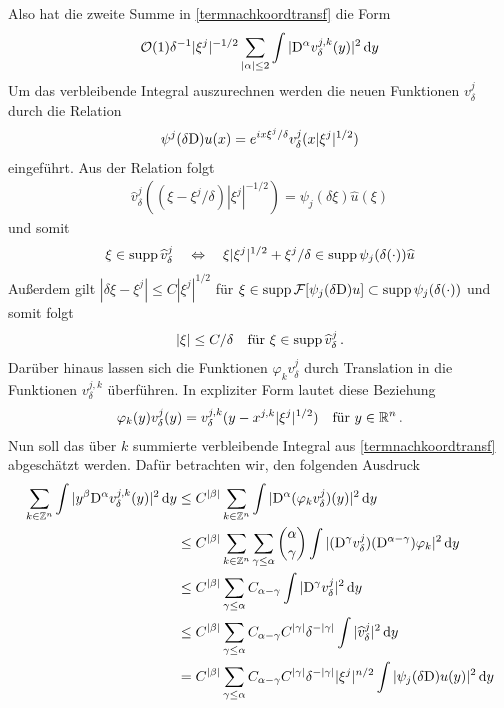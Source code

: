 Also hat die zweite Summe in \eqref{termnachkoordtransf} die Form
\begin{align*}\label{restnachkoord}
\mathcal O(1) \delta^{-1}|\xi^j|^{-1/2}\sum_{\lvert\alpha\rvert\le 2}\int  |\mathrm D^\alpha v^{j,k}_\delta(y)|^2\,\mathrm d y
\end{align*}
Um das verbleibende Integral auszurechnen werden die neuen Funktionen $v^j_\delta$ durch die Relation
\begin{align*}
\psi^j(\delta\mathrm D)u(x) = e^{ix\xi^j/\delta}v^j_\delta(x|\xi^j|^{1/2})
\end{align*}
eingeführt. Aus der Relation folgt
\begin{align*}
\widehat v^j_\delta ((\xi-\xi^j/\delta)|\xi^j|^{-1/2}) = \psi_j(\delta\xi)\widehat u(\xi)
\end{align*}
und somit
\begin{align*}
\xi \in\operatorname{supp}\widehat v^j_\delta \quad\Leftrightarrow\quad \xi|\xi^j|^{1/2} + \xi^j/\delta\in\operatorname{supp} \psi_j(\delta(\cdot))\widehat u
\end{align*}
Außerdem gilt $|\delta\xi-\xi^j|\le C|\xi^j|^{1/2}$ für $\xi\in\operatorname{supp} \mathcal F[\psi_j(\delta\mathrm D)u]\subset\operatorname{supp} \psi_j(\delta (\cdot))$ und somit folgt
\begin{align*}
|\xi|\le C/\delta \quad \text{für } \xi \in\operatorname{supp}\widehat v^j_\delta\,.
\end{align*}
Darüber hinaus lassen sich die Funktionen $\varphi_k v^j_\delta$ durch Translation in die Funktionen $v^{j,k}_\delta$ überführen. In expliziter Form lautet diese Beziehung
\begin{align*}
\varphi_k(y) v^j_\delta (y) = v^{j,k}_\delta (y-x^{j,k}|\xi^j|^{1/2})\quad\text{für }y\in\mathbb R^n\,.
\end{align*}
Nun soll das über $k$ summierte verbleibende Integral aus \eqref{termnachkoordtransf} abgeschätzt werden. Dafür betrachten wir, den folgenden Ausdruck
\begin{align*}
\sum_{k\in\mathbb Z^n} \int|y^\beta\mathrm D^\alpha v^{j,k}_\delta(y)|^2\,\mathrm d y &\le C^{\lvert\beta\rvert} \sum_{k\in\mathbb Z^n} \int |\mathrm D^\alpha(\varphi_k v^j_\delta)(y)|^2\,\mathrm d y \\
&\le C^{\lvert\beta\rvert} \sum_{k\in\mathbb Z^n}\sum_{\gamma\le\alpha}\binom{\alpha}{\gamma}\int |(\mathrm D^\gamma v^j_\delta)(\mathrm D^{\alpha-\gamma})\varphi_k|^2\,\mathrm d y\\
&\le C^{\lvert\beta\rvert}\sum_{\gamma\le\alpha}C_{\alpha-\gamma}\int |\mathrm D^\gamma v^j_\delta|^2\,\mathrm d y\\
&\le C^{\lvert\beta\rvert}\sum_{\gamma\le\alpha}C_{\alpha-\gamma}C^{\lvert\gamma\rvert}\delta^{-\lvert\gamma\rvert}\int |\widehat v^j_\delta|^2\,\mathrm d y\\
&= C^{\lvert\beta\rvert}\sum_{\gamma\le\alpha}C_{\alpha-\gamma}C^{\lvert\gamma\rvert}\delta^{-\lvert\gamma\rvert}|\xi^j|^{n/2}\int |\psi_j(\delta\mathrm D)u(y)|^2\,\mathrm d y
\end{align*}
